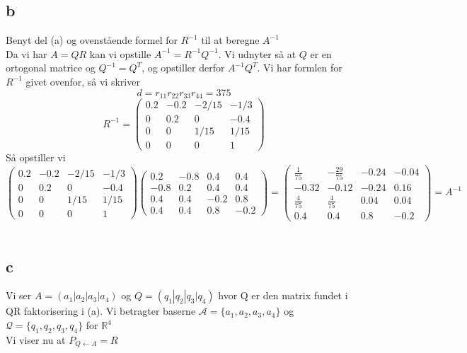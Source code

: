 \documentclass[a4paper,fleqn]{article}
\newcommand{\RR}{\mathbb{R}}
\newcommand{\A}{\mathcal{A}}
\newcommand{\Q}{\mathcal{Q}}
\begin{document}
	\subsection{b}
	Benyt del (a) og ovenstående formel for $R^{-1}$ til at beregne $A^{-1}$\\
	Da vi har $A = QR$ kan vi opstille $A^{-1} = R^{-1}Q^{-1}$. Vi udnyter så at $Q$ er en 
	ortogonal matrice og $Q^{-1} = Q^T$, og opstiller derfor $A^{-1}Q^T$. Vi har formlen for
	$R^{-1}$ givet ovenfor, så vi skriver
	\[ d = r_{11}r_{22}r_{33}r_{44} = 375 \]
	\[
		R^{-1} = \begin{pmatrix}
			0.2 & -0.2 & -2/15 & -1/3\\
			0 & 0.2 & 0 & -0.4\\
			0 & 0 & 1/15 & 1/15\\
			0 & 0 & 0 & 1
		\end{pmatrix}
	\]
	Så opstiller vi 
	\[
		\begin{pmatrix}
			0.2 & -0.2 & -2/15 & -1/3\\
			0 & 0.2 & 0 & -0.4\\
			0 & 0 & 1/15 & 1/15\\
			0 & 0 & 0 & 1
		\end{pmatrix}
		\left(\begin{array}{rrrr}
			0.2 & -0.8 & 0.4 & 0.4 \\
			-0.8 & 0.2 & 0.4 & 0.4 \\
			0.4 & 0.4 & -0.2 & 0.8 \\
			0.4 & 0.4 & 0.8 & -0.2
		\end{array}\right) = 
		\left(\begin{array}{rrrr}
		\frac{1}{75} & -\frac{29}{75} & -0.24 & -0.04 \\
		-0.32 & -0.12 & -0.24 & 0.16 \\
		\frac{4}{75} & \frac{4}{75} & 0.04 & 0.04 \\
		0.4 & 0.4 & 0.8 & -0.2
		\end{array}\right) = A^{-1}
	\]
	\\
		
	\subsection{c}
	Vi ser $A = (a_1|a_2|a_3|a_4)$ og $Q = (q_1|q_2|q_3|q_4)$ hvor Q er den matrix fundet i
	QR faktorisering i (a). Vi betragter baserne $\A = \{ a_1, a_2, a_3, a_4 \}$ og $\Q
	= \{q_1, q_2, q_3, q_4 \}$ for $\RR^4$\\
	Vi viser nu at $P_{Q\leftarrow A} = R$\\
\end{document}
